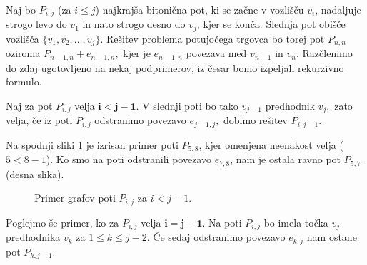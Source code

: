 \documentclass[12pt,a4paper]{amsart}
\theoremstyle{definition}
\theoremstyle{plain}
\begin{document}
\noindent
Naj bo $P_{i,j}$ (za $i \leq j$) najkrajša bitonična pot, ki se začne v vozlišču $v_i$, nadaljuje strogo levo
do $v_1$ in nato strogo desno do $v_j$, kjer se konča. Slednja pot obišče vozlišča $\{v_1, v_2, \ldots, v_j\}.$ Rešitev
problema potujočega trgovca bo torej pot $P_{n,n}$ oziroma $P_{n-1, n} + e_{n-1, n},$ kjer
je $e_{n-1, n}$ povezava med $v_{n-1}$ in $v_{n}.$ Razčlenimo do zdaj ugotovljeno na nekaj podprimerov, iz
česar bomo izpeljali rekurzivno formulo.
\newline

\noindent
Naj za pot $P_{i,j}$ velja $\bm{i < j - 1}$. V slednji poti bo tako $v_{j-1}$ predhodnik $v_j,$ zato velja,
če iz poti $P_{i,j}$ odstranimo povezavo $e_{j-1,j},$ dobimo rešitev $P_{i, j-1}.$
\newline

\noindent
Na spodnji sliki \ref{slika:1. primer} je izrisan primer poti $P_{5,8}$, kjer omenjena neenakost velja
($5 < 8 - 1$). Ko smo na poti odstranili povezavo $e_{7,8}$, nam je ostala ravno pot $P_{5,7}$ (desna slika).

\begin{figure}[!htb]%
  \centering
  \qquad
  \caption{Primer grafov poti $P_{i,j}$ za $i < j - 1.$}%
  \label{slika:1. primer}%
\end{figure}


\noindent
Poglejmo še primer, ko za $P_{i, j}$ velja $\bm{i = j - 1}$. Na poti $P_{i,j}$ bo imela točka $v_j$ predhodnika
$v_k$ za $1 \leq k \leq j - 2.$ Če sedaj odstranimo povezavo $e_{k,j}$ nam ostane pot $P_{k, j-1}.$
\newline
\end{document}
